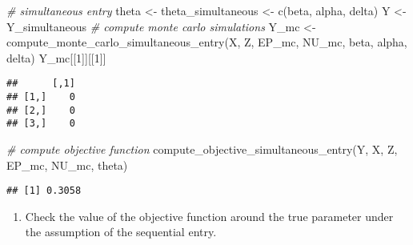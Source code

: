 \documentclass[
]{article}
\newenvironment{Shaded}{\begin{snugshade}}{\end{snugshade}}
\newcommand{\CommentTok}[1]{\textcolor[rgb]{0.56,0.35,0.01}{\textit{#1}}}
\newcommand{\DecValTok}[1]{\textcolor[rgb]{0.00,0.00,0.81}{#1}}
\newcommand{\FunctionTok}[1]{\textcolor[rgb]{0.00,0.00,0.00}{#1}}
\newcommand{\NormalTok}[1]{#1}
\newcommand{\OtherTok}[1]{\textcolor[rgb]{0.56,0.35,0.01}{#1}}
\providecommand{\tightlist}{%
  \setlength{\itemsep}{0pt}\setlength{\parskip}{0pt}}
\begin{document}
\begin{Shaded}
\begin{Highlighting}[]
\CommentTok{\# simultaneous entry}
\NormalTok{theta }\OtherTok{\textless{}{-}}\NormalTok{ theta\_simultaneous }\OtherTok{\textless{}{-}}
  \FunctionTok{c}\NormalTok{(beta, alpha, delta)}
\NormalTok{Y }\OtherTok{\textless{}{-}}\NormalTok{ Y\_simultaneous}
\CommentTok{\# compute monte carlo simulations}
\NormalTok{Y\_mc }\OtherTok{\textless{}{-}} \FunctionTok{compute\_monte\_carlo\_simultaneous\_entry}\NormalTok{(X, Z, EP\_mc, NU\_mc, beta, alpha, delta)}
\NormalTok{Y\_mc[[}\DecValTok{1}\NormalTok{]][[}\DecValTok{1}\NormalTok{]]}
\end{Highlighting}
\end{Shaded}

\begin{verbatim}
##      [,1]
## [1,]    0
## [2,]    0
## [3,]    0
\end{verbatim}

\begin{Shaded}
\begin{Highlighting}[]
\CommentTok{\# compute objective function}
\FunctionTok{compute\_objective\_simultaneous\_entry}\NormalTok{(Y, X, Z, EP\_mc, NU\_mc, theta)}
\end{Highlighting}
\end{Shaded}

\begin{verbatim}
## [1] 0.3058
\end{verbatim}

\begin{enumerate}
\def\labelenumi{\arabic{enumi}.}
\setcounter{enumi}{3}
\tightlist
\item
  Check the value of the objective function around the true parameter
  under the assumption of the sequential entry.
\end{enumerate}
\end{document}
